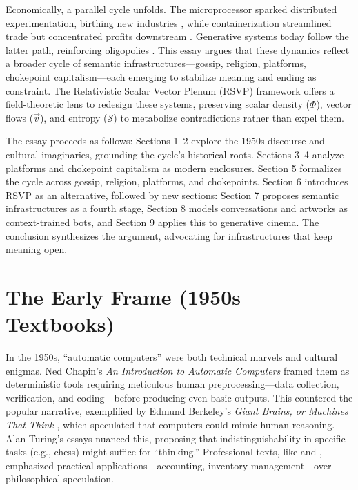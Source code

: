 \documentclass[a4paper,12pt]{article}
\newcommand{\Scal}{\mathcal{S}} %
\newcommand{\vvec}{\vec{v}} %
\begin{document}
Economically, a parallel cycle unfolds. The microprocessor sparked distributed experimentation, birthing new industries \citep{perez2002technological}, while containerization streamlined trade but concentrated profits downstream \citep{neumann2025ai}. Generative systems today follow the latter path, reinforcing oligopolies \citep{giblin2022chokepoint}. This essay argues that these dynamics reflect a broader cycle of semantic infrastructures—gossip, religion, platforms, chokepoint capitalism—each emerging to stabilize meaning and ending as constraint. The Relativistic Scalar Vector Plenum (RSVP) framework \citep{semantic2025} offers a field-theoretic lens to redesign these systems, preserving scalar density ($\Phi$), vector flows ($\vvec$), and entropy ($\Scal$) to metabolize contradictions rather than expel them.

The essay proceeds as follows: Sections 1–2 explore the 1950s discourse and cultural imaginaries, grounding the cycle’s historical roots. Sections 3–4 analyze platforms and chokepoint capitalism as modern enclosures. Section 5 formalizes the cycle across gossip, religion, platforms, and chokepoints. Section 6 introduces RSVP as an alternative, followed by new sections: Section 7 proposes semantic infrastructures as a fourth stage, Section 8 models conversations and artworks as context-trained bots, and Section 9 applies this to generative cinema. The conclusion synthesizes the argument, advocating for infrastructures that keep meaning open.

\section{The Early Frame (1950s Textbooks)}
In the 1950s, ``automatic computers'' were both technical marvels and cultural enigmas. Ned Chapin’s \emph{An Introduction to Automatic Computers} \citep{chapin1963automatic} framed them as deterministic tools requiring meticulous human preprocessing—data collection, verification, and coding—before producing even basic outputs. This countered the popular narrative, exemplified by Edmund Berkeley’s \emph{Giant Brains, or Machines That Think} \citep{berkeley1949giant}, which speculated that computers could mimic human reasoning. Alan Turing’s essays \citep{turing1950computing,turing1956can} nuanced this, proposing that indistinguishability in specific tasks (e.g., chess) might suffice for ``thinking.'' Professional texts, like \citet{williams1959digital} and \citet{gregory1960automatic}, emphasized practical applications—accounting, inventory management—over philosophical speculation. 
\end{document}
